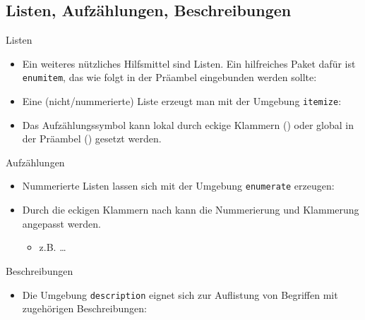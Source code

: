 \subsection{Listen, Aufzählungen, Beschreibungen}

\begin{frame}{Listen}
    \begin{itemize}
        \item Ein weiteres nützliches Hilfsmittel sind \alert{Listen}. Ein hilfreiches Paket dafür
            ist \texttt{enumitem}, das wie folgt in der Präambel eingebunden werden sollte:
            \begin{center}
            \end{center}
        \item Eine (nicht\-/nummerierte) Liste erzeugt man mit der Umgebung \texttt{itemize}:
        \item Das Aufzählungssymbol kann lokal durch eckige Klammern (\code{\\item[...]}) oder
            global in der Präambel () gesetzt werden.
    \end{itemize}
\end{frame}

\begin{frame}{Aufzählungen}
    \begin{itemize}
        \item Nummerierte Listen lassen sich mit der Umgebung \texttt{enumerate} erzeugen:
        \item Durch die eckigen Klammern nach  kann die Nummerierung
            und Klammerung angepasst werden.
            \begin{itemize}
                \item z.B. \code{[(i)], [1)], [A.],} \dots
            \end{itemize}
    \end{itemize}
\end{frame}

\begin{frame}{Beschreibungen}
    \begin{itemize}
        \item Die Umgebung \texttt{description} eignet sich zur Auflistung von Begriffen mit
            zugehörigen Beschreibungen:
    \end{itemize}
\end{frame}
